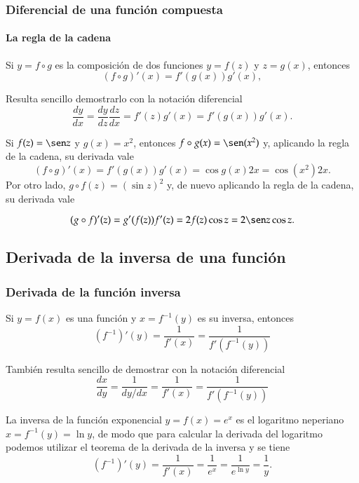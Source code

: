 \begin{frame}
	\frametitle{Diferencial de una función compuesta}
	\framesubtitle{La regla de la cadena}
	\begin{teorema} Si
		$y=f\circ g$ es la composición de dos funciones $y=f(z)$ y $z=g(x)$, entonces
		\[
			(f\circ g)'(x)=f'(g(x))g'(x),
		\]
	\end{teorema}
	
	Resulta sencillo demostrarlo con la notación diferencial
	\[
		\frac{dy}{dx}=\frac{dy}{dz}\frac{dz}{dx}=f'(z)g'(x)=f'(g(x))g'(x).
	\]
	
	 Si $f(z)=\sen z$ y $g(x)=x^2$, entonces $f\circ g(x)=\sen(x^2)$ y, aplicando la regla de la cadena, su derivada
	vale
	\[
		(f\circ g)'(x)=f'(g(x))g'(x) = \cos g(x) 2x = \cos(x^2)2x.
	\]
	Por otro lado, $g\circ f(z)= (\sin z)^2$ y, de nuevo aplicando la regla de la cadena, su derivada vale
	
	\[
		(g\circ f)'(z)=g'(f(z))f'(z) = 2f(z)\cos z = 2\sen z\cos z.
	\]
\end{frame}



\subsection{Derivada de la inversa de una función}
\begin{frame}
	\frametitle{Derivada de la función inversa}
	\begin{teorema}
		Si $y=f(x)$ es una función y $x=f^{-1}(y)$ es su inversa, entonces
		\[
			\left(f^{-1}\right)'(y)=\frac{1}{f'(x)}=\frac{1}{f'(f^{-1}(y))}
		\]
	\end{teorema}
	
	También resulta sencillo de demostrar con la notación diferencial
	\[
		\frac{dx}{dy}=\frac{1}{dy/dx}=\frac{1}{f'(x)}=\frac{1}{f'(f^{-1}(y))}
	\]
	
	 La inversa de la función exponencial $y=f(x)=e^x$ es el logaritmo neperiano $x=f^{-1}(y)=\ln y$, de modo que
	para calcular la derivada del logaritmo podemos utilizar el teorema de la derivada de la inversa y se tiene
	\[
		\left(f^{-1}\right)'(y)=\frac{1}{f'(x)}=\frac{1}{e^x}=\frac{1}{e^{\ln y}}=\frac{1}{y}.
	\]
\end{frame}




